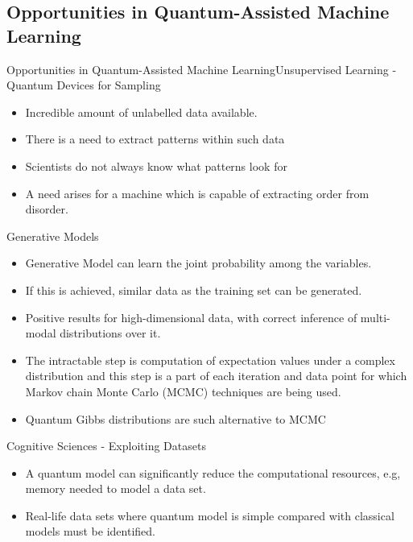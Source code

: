 \documentclass[aspectratio=169, handout]{beamer}
\theoremstyle{example}
\begin{document}
\subsection{Opportunities in Quantum-Assisted Machine Learning}
\begin{frame}{Opportunities in Quantum-Assisted Machine Learning}{Unsupervised Learning - Quantum Devices for Sampling}
  \begin{itemize}
  \pause\item {
     Incredible amount of unlabelled data available.
  }
   \pause\item {
     There is a need to extract patterns within such data
  }
   \pause\item {
  Scientists do not always know what patterns look for
  }
   \pause\item {
  A need arises for a machine which is capable of extracting order from disorder.
  }
  
  
  \end{itemize}
\end{frame}
\begin{frame}{Generative Models}
  \begin{itemize}
  \pause\item {
   Generative Model can learn the joint probability among the variables. 
  }
  \pause\item {
    If this is achieved, similar data as the training set can be generated.
  }
  \pause\item {
    Positive results for high-dimensional data, with correct inference of multi-modal distributions over it.
  }
  \pause\item {
   The intractable step is computation of expectation values under a complex distribution and this step is a part of each iteration and data point for which Markov chain Monte Carlo (MCMC) techniques are being used.
  }
  \pause\item {
    Quantum Gibbs distributions are such alternative to MCMC
  }
  \end{itemize}
\end{frame}
\begin{frame}{Cognitive Sciences - Exploiting Datasets}
  \begin{itemize}
  \pause\item {
    A quantum model can significantly reduce the computational resources, e.g, memory needed to model a data set.
  }
    \pause\item {
    Real-life data sets where quantum model is simple compared with classical models must be identified. 
  }

  \end{itemize}
\end{frame}
\end{document}
